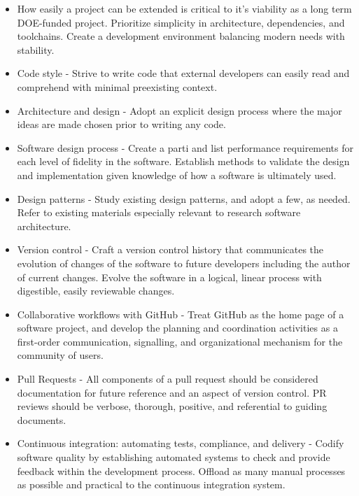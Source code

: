 \documentclass[]{nrel}
\begin{document}
\begin{itemize}
\item How easily a project can be extended is critical to it's viability as a long term
DOE-funded project.
Prioritize simplicity in architecture, dependencies, and toolchains.
Create a development environment balancing modern needs with stability.
\item Code style - Strive to write code that external developers can easily read and comprehend with minimal
preexisting context.
\item Architecture and design - Adopt an explicit design process where the major ideas are made chosen prior to writing any code.
\item Software design process - Create a parti and list performance requirements for each level of fidelity in the software.
Establish methods to validate the design and implementation given knowledge of how a software
is ultimately used.
\item Design patterns - Study existing design patterns, and adopt a few, as needed.
Refer to existing materials especially relevant to research software architecture.
\item Version control - Craft a version control history that communicates the evolution of changes of the software
to future developers including the author of current changes.
Evolve the software in a logical, linear process with digestible, easily reviewable changes.
\item Collaborative workflows with GitHub - Treat GitHub as the home page of a software project, and develop the planning and coordination
activities as a first-order communication, signalling, and organizational mechanism for the
community of users.
\item Pull Requests - All components of a pull request should be considered documentation for future reference
and an aspect of version control.
PR reviews should be verbose, thorough, positive, and referential to guiding documents.
\item Continuous integration: automating tests, compliance, and delivery - Codify software quality by establishing automated systems to check and provide feedback
within the development process.
Offload as many manual processes as possible and practical to the continuous integration system.
\end{itemize}
\end{document}
